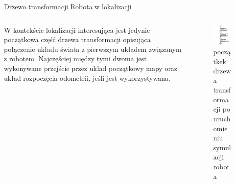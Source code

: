\begin{frame}
{Drzewo transformacji Robota w lokalizacji}
	\begin{columns}
		\begin{column}{0.5\textwidth}
				W kontekście lokalizacji interesująca jest jedynie początkowa część drzewa transformacji opisująca połączenie układu świata z pierwszym układem związanym z robotem.
	Najczęściej między tymi dwoma jest wykonywane przejście przez układ początkowy mapy oraz układ rozpoczęcia odometrii, jeśli jest wykorzystywana.
		\end{column}
		\begin{column}{0.5\textwidth}  %
			\begin{figure}
				\begin{center}
					\includegraphics[height=0.6\textheight]{img/velma_tf.png} 
					\caption{początkek drzewa transformacji po uruchomieniu symulacji robota}
				\end{center}
			\end{figure}
		\end{column}
	\end{columns}
\end{frame}

